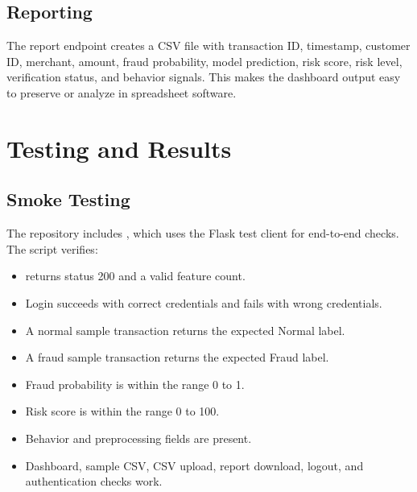 \documentclass[12pt,a4paper]{report}
\begin{document}
\section{Reporting}
The report endpoint creates a CSV file with transaction ID, timestamp, customer ID, merchant, amount, fraud probability, model prediction, risk score, risk level, verification status, and behavior signals. This makes the dashboard output easy to preserve or analyze in spreadsheet software.

\chapter{Testing and Results}

\section{Smoke Testing}
The repository includes , which uses the Flask test client for end-to-end checks. The script verifies:
\begin{itemize}
    \item {} returns status 200 and a valid feature count.
    \item Login succeeds with correct credentials and fails with wrong credentials.
    \item A normal sample transaction returns the expected Normal label.
    \item A fraud sample transaction returns the expected Fraud label.
    \item Fraud probability is within the range 0 to 1.
    \item Risk score is within the range 0 to 100.
    \item Behavior and preprocessing fields are present.
    \item Dashboard, sample CSV, CSV upload, report download, logout, and authentication checks work.
\end{itemize}
\end{document}
